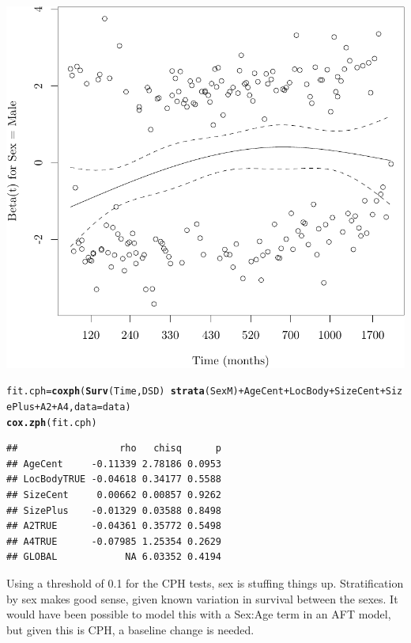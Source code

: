 \documentclass{article}\usepackage[]{graphicx}\usepackage[]{color}
\makeatletter
\def\maxwidth{ %
  \ifdim\Gin@nat@width>\linewidth
    \linewidth
  \else
    \Gin@nat@width
  \fi
}
\newcommand{\hlopt}[1]{\textcolor[rgb]{0,0,0}{#1}}%
\newcommand{\hlstd}[1]{\textcolor[rgb]{0.345,0.345,0.345}{#1}}%
\newcommand{\hlkwb}[1]{\textcolor[rgb]{0.69,0.353,0.396}{#1}}%
\newcommand{\hlkwc}[1]{\textcolor[rgb]{0.333,0.667,0.333}{#1}}%
\newcommand{\hlkwd}[1]{\textcolor[rgb]{0.737,0.353,0.396}{\textbf{#1}}}%
\newenvironment{kframe}{%
 \def\at@end@of@kframe{}%
 \ifinner\ifhmode%
  \def\at@end@of@kframe{\end{minipage}}%
  \begin{minipage}{\columnwidth}%
 \fi\fi%
 \def\FrameCommand##1{\hskip\@totalleftmargin \hskip-\fboxsep
 \colorbox{shadecolor}{##1}\hskip-\fboxsep
     \hskip-\linewidth \hskip-\@totalleftmargin \hskip\columnwidth}%
 \MakeFramed {\advance\hsize-\width
   \@totalleftmargin\z@ \linewidth\hsize
   \@setminipage}}%
 {\par\unskip\endMakeFramed%
 \at@end@of@kframe}
\newenvironment{knitrout}{}{} %
\makeatother
\begin{document}
\begin{knitrout}
{\centering \includegraphics[width=\maxwidth]{figure/05-eda-ph-check-full-1} 

}


\begin{kframe}\begin{alltt}
\hlstd{fit.cph} \hlkwb{=} \hlkwd{coxph}\hlstd{(}\hlkwd{Surv}\hlstd{(Time, DSD)} \hlopt{~} \hlkwd{strata}\hlstd{(SexM)} \hlopt{+} \hlstd{AgeCent} \hlopt{+} \hlstd{LocBody} \hlopt{+} \hlstd{SizeCent} \hlopt{+} \hlstd{SizePlus} \hlopt{+} \hlstd{A2} \hlopt{+} \hlstd{A4,} \hlkwc{data} \hlstd{= data)}
\hlkwd{cox.zph}\hlstd{(fit.cph)}
\end{alltt}
\begin{verbatim}
##                  rho   chisq      p
## AgeCent     -0.11339 2.78186 0.0953
## LocBodyTRUE -0.04618 0.34177 0.5588
## SizeCent     0.00662 0.00857 0.9262
## SizePlus    -0.01329 0.03588 0.8498
## A2TRUE      -0.04361 0.35772 0.5498
## A4TRUE      -0.07985 1.25354 0.2629
## GLOBAL            NA 6.03352 0.4194
\end{verbatim}
\end{kframe}
\end{knitrout}
Using a threshold of 0.1 for the CPH tests, sex is stuffing things up.  Stratification by sex makes good sense, given known variation in survival between the sexes.  It would have been possible to model this with a Sex:Age term in an AFT model, but given this is CPH, a baseline change is needed.
\end{document}
